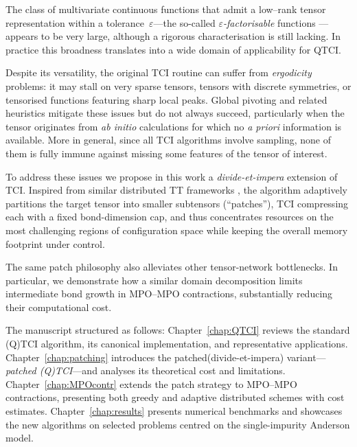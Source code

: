 The class of multivariate continuous functions that admit a low–rank tensor representation within a tolerance~$\varepsilon$—the so-called \emph{$\varepsilon$-factorisable} functions \cite{Fernandez2022}—appears to be
very large, although a rigorous characterisation is still lacking.  In practice this broadness translates into a wide domain of applicability for QTCI. 

Despite its versatility, the original TCI routine can suffer from \emph{ergodicity} problems: it may stall on very sparse tensors, tensors with
discrete symmetries, or tensorised functions featuring sharp local peaks. Global pivoting and related heuristics \cite{Fernandez2024} mitigate these issues but do not always succeed, particularly when the tensor originates from \textit{ab initio} calculations for which no \emph{a priori} information is available. More in general, since all TCI algorithms involve sampling, none of them is fully immune against missing some features of the tensor of interest.

To address these issues we propose in this work a \emph{divide-et-impera} extension of TCI. Inspired from similar distributed TT frameworks \cite{Hiroshi2023,Ehrlacher2021}, the algorithm adaptively partitions the target tensor into smaller subtensors (“patches”), TCI compressing each with a fixed bond-dimension cap, and thus concentrates resources on the most challenging regions of configuration space while keeping the overall memory footprint under control. 

The same patch philosophy also alleviates other tensor-network bottlenecks. In particular, we demonstrate how a similar domain decomposition limits intermediate bond growth in MPO–MPO contractions, substantially reducing their computational cost.


The manuscript structured as follows: Chapter~\ref{chap:QTCI} reviews the standard (Q)TCI algorithm, its canonical implementation, and representative applications. Chapter~\ref{chap:patching} introduces the patched(divide-et-impera) variant—\emph{patched (Q)TCI}—and analyses its theoretical cost and limitations. Chapter~\ref{chap:MPOcontr} extends the patch strategy to MPO–MPO contractions, presenting both greedy and adaptive distributed schemes with cost estimates. Chapter~\ref{chap:results} presents numerical benchmarks and showcases the new algorithms on selected problems centred on the single-impurity Anderson model.


